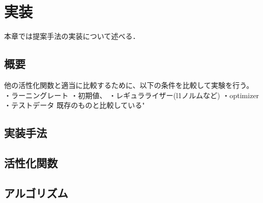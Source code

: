 \chapter{実装}
\label{implementation}

本章では提案手法の実装について述べる．

\section{概要}
他の活性化関数と適当に比較するために、以下の条件を比較して実験を行う。
・ラーニングレート
・初期値、
・レギュラライザー(l1ノルムなど)
・optimizer
・テストデータ
既存のものと比較している"

\section{実装手法}
\section{活性化関数}
\section{アルゴリズム}
\section{}
\section{}

